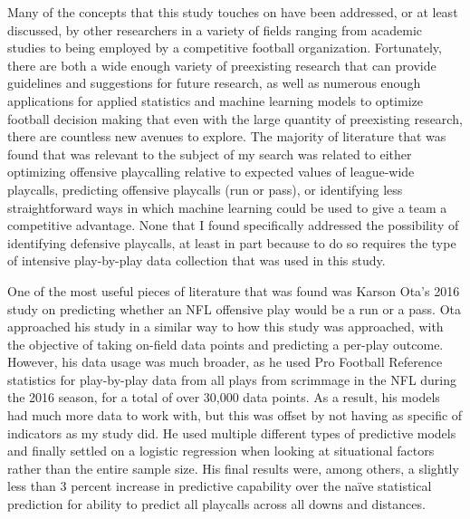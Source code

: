 \documentclass{article}
\begin{document}
	Many of the concepts that this study touches on have been addressed, or at least discussed, by other researchers in a variety of fields ranging from academic studies to being employed by a competitive football organization. Fortunately, there are both a wide enough variety of preexisting research that can provide guidelines and suggestions for future research, as well as numerous enough applications for applied statistics and machine learning models to optimize football decision making that even with the large quantity of preexisting research, there are countless new avenues to explore. The majority of literature that was found that was relevant to the subject of my search was related to either optimizing offensive playcalling relative to expected values of league-wide playcalls, predicting offensive playcalls (run or pass), or identifying less straightforward ways in which machine learning could be used to give a team a competitive advantage. None that I found specifically addressed the possibility of identifying defensive playcalls, at least in part because to do so requires the type of intensive play-by-play data collection that was used in this study.
	
	One of the most useful pieces of literature that was found was Karson Ota’s 2016 study on predicting whether an NFL offensive play would be a run or a pass. Ota approached his study in  a similar way to how this study was approached, with the objective of taking on-field data points and predicting a per-play outcome. However, his data usage was much broader, as he used Pro Football Reference statistics for play-by-play data from all plays from scrimmage in the NFL during the 2016 season, for a total of over 30,000 data points. As a result, his models had much more data to work with, but this was offset by not having as specific of indicators as my study did. He used multiple different types of predictive models and finally settled on a logistic regression when looking at situational factors rather than the entire sample size. His final results were, among others, a slightly less than 3 percent increase in predictive capability over the naïve statistical prediction for ability to predict all playcalls across all downs and distances. 
	
\end{document}
